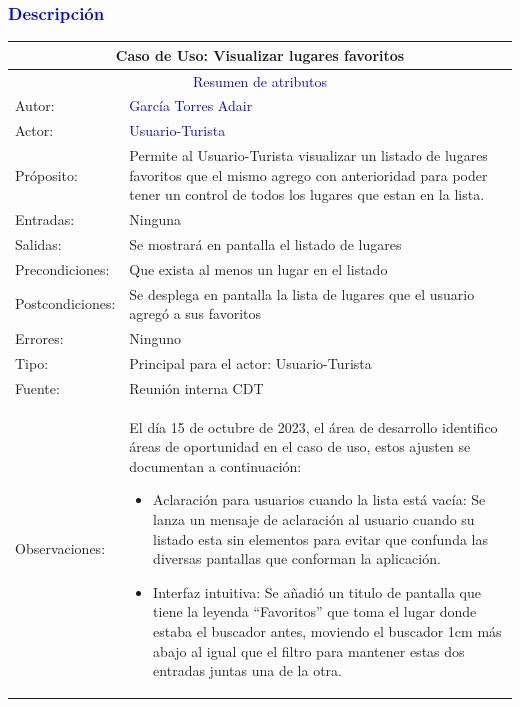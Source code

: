 \subsubsection{\textcolor{blue}{Descripción}}
\begin{tabularx}{16cm}{||l|X||}
	\hline
	\multicolumn{2}{||c||}{Caso de Uso: Visualizar lugares favoritos} \\
	\hline
	\multicolumn{2}{||c||}{\textcolor{blue}{Resumen de atributos}} \\
        \hline
	{Autor:} & {\textcolor{blue}{García Torres Adair}} \\
	\hline
	{Actor:} & {\textcolor{blue}{Usuario-Turista}} \\
	\hline
	{Próposito:} & {
            Permite al Usuario-Turista visualizar un listado de lugares favoritos que el mismo agrego con anterioridad para poder tener un control de todos los lugares que estan en la lista.
 
    } \\
	\hline
	{Entradas:} & {Ninguna}\\
	\hline
	{Salidas:} & {Se mostrará en pantalla el listado de lugares}\\
	\hline
	{Precondiciones:} & {Que exista al menos un lugar en el listado}\\ 
	\hline
	{Postcondiciones:} & {Se desplega en pantalla la lista de lugares que el usuario agregó a sus favoritos}\\
	\hline
	{Errores:} & {Ninguno} \\
	\hline
	{Tipo:} & {Principal para el actor: Usuario-Turista}\\
	\hline
	{Fuente:} & {Reunión interna CDT} \\
	\hline
	
    Observaciones: & El día 15 de octubre de 2023, el área de desarrollo identifico áreas de oportunidad en el caso de uso, estos ajusten se documentan a continuación:
                \begin{itemize}
                    \item {
                    Aclaración para usuarios cuando la lista está vacía: Se lanza un mensaje de aclaración al usuario cuando su listado esta sin elementos para evitar que confunda las diversas pantallas que conforman la aplicación.
                    }
                    \item {
                    Interfaz intuitiva: Se añadió un titulo de pantalla que tiene la leyenda “Favoritos” que toma el lugar donde estaba el buscador antes, moviendo el buscador 1cm más abajo al igual que el filtro para mantener estas dos entradas juntas una de la otra.
                    }
                \end{itemize}


 
     \\
	\hline
\end{tabularx}

